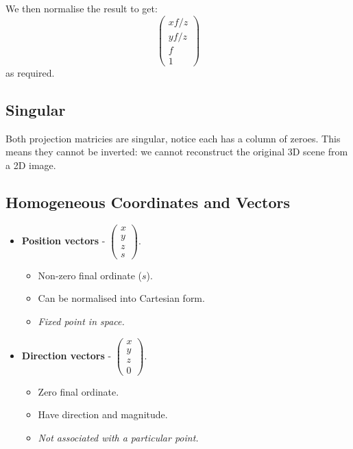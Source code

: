 \documentclass[11pt]{article}
\begin{document}
We then normalise the result to get:
\[
  \begin{pmatrix} xf/z \\ yf/z \\ f \\ 1 \end{pmatrix}  
\]
as required.

\subsection{Singular}
Both projection matricies are singular, notice each has a column of zeroes.
This means they cannot be inverted: we cannot reconstruct the original 3D scene from a 2D image.

\subsection{Homogeneous Coordinates and Vectors}
\begin{itemize}
  \item \textbf{Position vectors} - $\begin{pmatrix} x \\ y \\ z \\ s \end{pmatrix}$.
    \begin{itemize}
      \item Non-zero final ordinate ($s$).
      \item Can be normalised into Cartesian form.
      \item \textit{Fixed point in space.}
    \end{itemize}
  \item \textbf{Direction vectors} - $\begin{pmatrix} x \\ y \\ z \\ 0 \end{pmatrix}$.
    \begin{itemize}
      \item Zero final ordinate.
      \item Have direction and magnitude.
      \item \textit{Not associated with a particular point.}
    \end{itemize}
\end{itemize}
\end{document}

